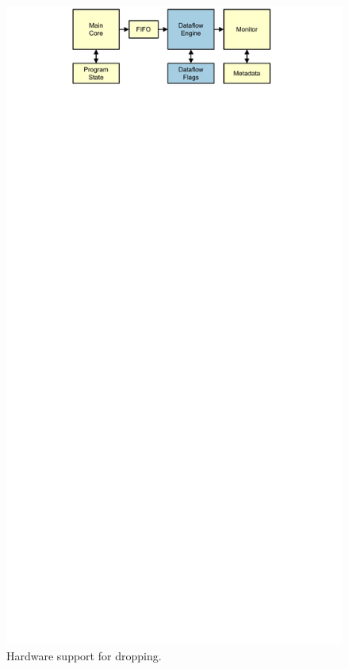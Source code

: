 \begin{figure}
  \begin{center}
    \includegraphics{monitoring_dift_drop/figs/dataflow_overview.pdf}
    \caption{Hardware support for dropping.}
    \label{fig:monitoring_dift_drop.dropping.dataflow_overview}
  \end{center}
\end{figure}

